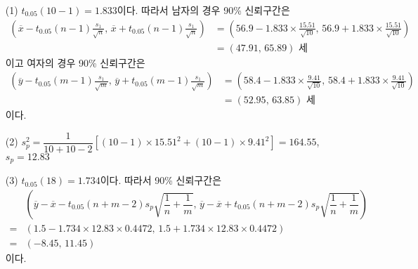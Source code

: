 \begin{itemize} 
    \item[(1)] {
        $t_{0.05}\left(10-1\right)=1.833$이다. 따라서 남자의 경우 90\% 신뢰구간은
        \begin{align*}
            \left(\overline{x}-t_{0.05}\left(n-1\right)\frac{s_1}{\sqrt{n}},\,\overline{x}+t_{0.05}\left(n-1\right)\frac{s_1}{\sqrt{n}}\right)
            &= \left(56.9-1.833\times\frac{15.51}{\sqrt{10}},\,56.9+1.833\times\frac{15.51}{\sqrt{10}}\right) \\
            &= \left(47.91,\,65.89\right)\mbox{ 세}
        \end{align*}
        이고 여자의 경우 90\% 신뢰구간은
        \begin{align*}
            \left(\overline{y}-t_{0.05}\left(m-1\right)\frac{s_1}{\sqrt{m}},\,\overline{y}+t_{0.05}\left(m-1\right)\frac{s_1}{\sqrt{m}}\right)
            &= \left(58.4-1.833\times\frac{9.41}{\sqrt{10}},\,58.4+1.833\times\frac{9.41}{\sqrt{10}}\right) \\
            &= \left(52.95,\,63.85\right)\mbox{ 세}
        \end{align*}
        이다.
    }
    \item[(2)] {
        $s_p^2 = \dfrac{1}{10+10-2}\left[\left(10-1\right)\times15.51^2+\left(10-1\right)\times9.41^2\right]=164.55$, $s_p=12.83$
    }
    \item[(3)] {
        $t_{0.05}\left(18\right)=1.734$이다. 따라서 90\% 신뢰구간은
        \begin{align*}
            & \left(\overline{y}-\overline{x}-t_{0.05}\left(n+m-2\right)s_p\sqrt{\dfrac{1}{n}+\dfrac{1}{m}},\,\overline{y}-\overline{x}+t_{0.05}\left(n+m-2\right)s_p\sqrt{\dfrac{1}{n}+\dfrac{1}{m}}\right)\\
           =& \left(1.5-1.734\times12.83\times0.4472,\,1.5+1.734\times12.83\times0.4472\right) \\
           =& \left(-8.45,\,11.45\right)
        \end{align*}
        이다.
    }
\end{itemize}